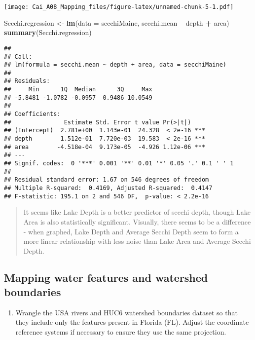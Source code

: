 \documentclass[]{article}
\newenvironment{Shaded}{\begin{snugshade}}{\end{snugshade}}
\newcommand{\DataTypeTok}[1]{\textcolor[rgb]{0.13,0.29,0.53}{#1}}
\newcommand{\KeywordTok}[1]{\textcolor[rgb]{0.13,0.29,0.53}{\textbf{#1}}}
\newcommand{\NormalTok}[1]{#1}
\newcommand{\OperatorTok}[1]{\textcolor[rgb]{0.81,0.36,0.00}{\textbf{#1}}}
\newcommand{\StringTok}[1]{\textcolor[rgb]{0.31,0.60,0.02}{#1}}
\providecommand{\tightlist}{%
  \setlength{\itemsep}{0pt}\setlength{\parskip}{0pt}}
\begin{document}
\texttt{[image: Cai\_A08\_Mapping\_files/figure-latex/unnamed-chunk-5-1.pdf]}

\begin{Shaded}
\begin{Highlighting}[]
\NormalTok{Secchi.regression <-}\StringTok{ }\KeywordTok{lm}\NormalTok{(}\DataTypeTok{data =}\NormalTok{ secchiMaine, secchi.mean }\OperatorTok{~}\StringTok{ }\NormalTok{depth }\OperatorTok{+}\StringTok{ }\NormalTok{area)}
\KeywordTok{summary}\NormalTok{(Secchi.regression)}
\end{Highlighting}
\end{Shaded}

\begin{verbatim}
## 
## Call:
## lm(formula = secchi.mean ~ depth + area, data = secchiMaine)
## 
## Residuals:
##     Min      1Q  Median      3Q     Max 
## -5.8481 -1.0782 -0.0957  0.9486 10.0549 
## 
## Coefficients:
##               Estimate Std. Error t value Pr(>|t|)    
## (Intercept)  2.781e+00  1.143e-01  24.328  < 2e-16 ***
## depth        1.512e-01  7.720e-03  19.583  < 2e-16 ***
## area        -4.518e-04  9.173e-05  -4.926 1.12e-06 ***
## ---
## Signif. codes:  0 '***' 0.001 '**' 0.01 '*' 0.05 '.' 0.1 ' ' 1
## 
## Residual standard error: 1.67 on 546 degrees of freedom
## Multiple R-squared:  0.4169, Adjusted R-squared:  0.4147 
## F-statistic: 195.1 on 2 and 546 DF,  p-value: < 2.2e-16
\end{verbatim}

\begin{quote}
It seems like Lake Depth is a better predictor of secchi depth, though
Lake Area is also statistically significant. Visually, there seems to be
a difference - when graphed, Lake Depth and Average Secchi Depth seem to
form a more linear relationship with less noise than Lake Area and
Average Secchi Depth.
\end{quote}

\hypertarget{mapping-water-features-and-watershed-boundaries}{%
\subsection{Mapping water features and watershed
boundaries}\label{mapping-water-features-and-watershed-boundaries}}

\begin{enumerate}
\def\labelenumi{\arabic{enumi}.}
\setcounter{enumi}{9}
\tightlist
\item
  Wrangle the USA rivers and HUC6 watershed boundaries dataset so that
  they include only the features present in Florida (FL). Adjust the
  coordinate reference systems if necessary to ensure they use the same
  projection.
\end{enumerate}
\end{document}
